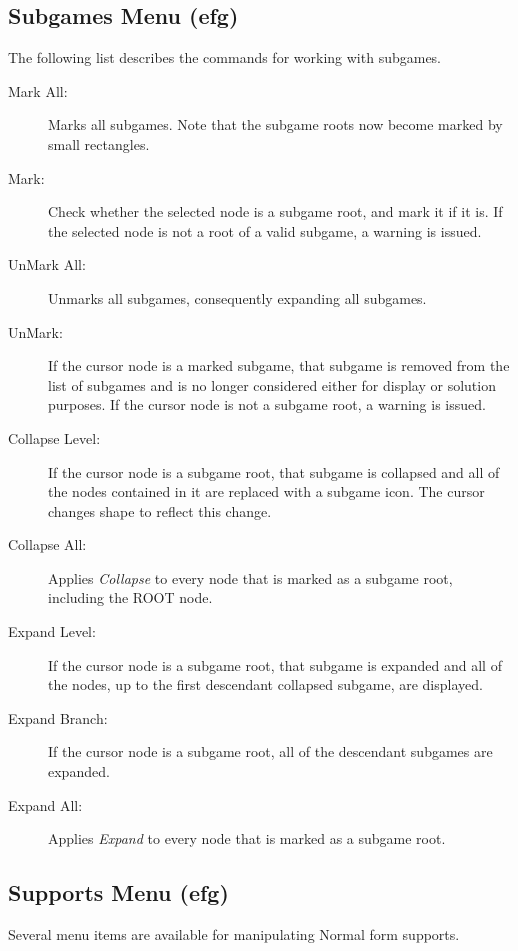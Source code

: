 \documentclass[12pt]{report}
\begin{document}
\subsection{Subgames Menu (efg)}\label{SubgamesMenu}

The following list describes the commands for working with subgames. 

\begin{description}
\item[Mark All:] Marks all subgames.  Note that the subgame roots now
become marked by small rectangles.
\item[Mark:] Check whether the selected node is a subgame root, and mark
it if it is.  If the selected node is not a root of a valid subgame, a
warning is issued.
\item[UnMark All:] Unmarks all subgames, consequently expanding all
subgames.
\item[UnMark:] If the cursor node is a marked subgame, that subgame is
removed from the list of subgames and is no longer considered either
for display or solution purposes.  If the cursor node is not a subgame
root, a warning is issued.
\item[Collapse Level:] If the cursor node is a subgame root, that
subgame is collapsed and all of the nodes contained in it are replaced
with a subgame icon.  The cursor changes shape to reflect this change.
\item[Collapse All:] Applies {\em Collapse} to every node that is
marked as a subgame root, including the ROOT node.
\item[Expand Level:] If the cursor node is a subgame root, that
subgame is expanded and all of the nodes, up to the first descendant
collapsed subgame, are displayed.
\item[Expand Branch:] If the cursor node is a subgame root, all of the
descendant subgames are expanded.
\item[Expand All:] Applies {\em Expand} to every node that is marked
as a subgame root.
\end{description}

\subsection{Supports Menu (efg)}\label{efsupport}

Several menu items are available for manipulating Normal form supports.  
\end{document}
